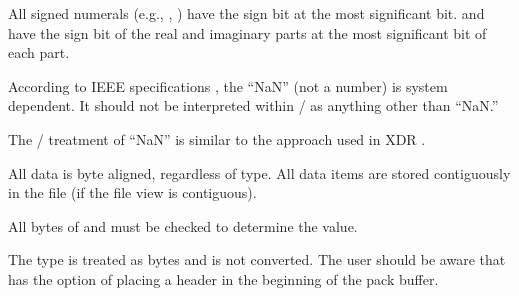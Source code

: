 All signed numerals (e.g., , )
have the sign bit at the most significant bit.
 and  have the sign
bit of the real and imaginary parts at the most significant bit of each part.

According to IEEE specifications \cite{ieee-754-2008}, the ``NaN''
(not a number) is system dependent.
 It should not be interpreted within \MPI/ as
anything other than ``NaN.''

\begin{implementors}
The \MPI/ treatment of ``NaN'' is similar to the approach used in XDR \cite{IETF-RFC4506}.
\end{implementors}

All data is byte aligned, regardless of type.
All data items are stored contiguously in the file
(if the file view is contiguous).

\begin{implementors}
All bytes of  and  must be checked
to determine the value.
\end{implementors}

\begin{users}
The type  is treated as bytes and is not converted.
The user should be aware that  has the option of placing
a header in the beginning of the pack buffer.
\end{users}

